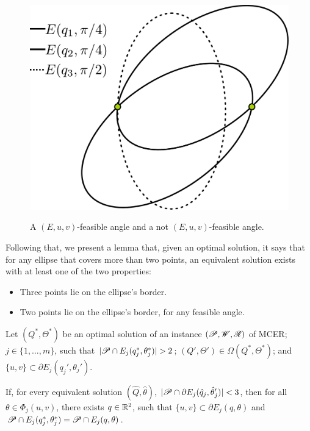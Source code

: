 \begin{figure}[H]
	\centering
	\caption{A $(E, u, v)$-feasible angle and a not $(E, u, v)$-feasible angle.}
	\includegraphics[scale=.33]{tex/figures/feasible-angle2}
	\fautor
	\label{fig:feasible-angle}
\end{figure}

Following that, we present a lemma that, given an optimal solution, it says that for any ellipse that covers more than two points, an equivalent solution exists with at least one of the two properties:
\begin{itemize}
	\item Three points lie on the ellipse's border.
	\item Two points lie on the ellipse's border, for any feasible angle.
\end{itemize}

\begin{lema}\label{lema:3pnts}
Let $(Q^*, \Theta^*)$ be an optimal solution of an instance $(\mathscr{P}, \mathscr{W}, \mathscr{R})$ of MCER; $j\in\{1, \dots, m\}$, such that $|\Pp \cap E_j(q_j^*, \theta_j^*)|>2$; $(Q', \Theta')\in\Omega(Q^*, \Theta^*)$; and $\{u, v\}\subset \partial E_j(q_j', \theta_j')$.

If, for every equivalent solution $(\hat{Q}, \hat{\theta})$, $|\mathscr{P}\cap \partial E_j(\hat{q}_j, \hat{\theta}'_j)| < 3$, then for all $\theta\in\Phi_j(u,v)$, there exists $q\in\mathbb{R}^2$, such that $\{u, v\} \subset \partial E_j(q, \theta)$ and $\mathscr{P} \cap E_j(q^*_j, \theta^*_j) = \mathscr{P} \cap E_j(q, \theta)$.

\end{lema}

